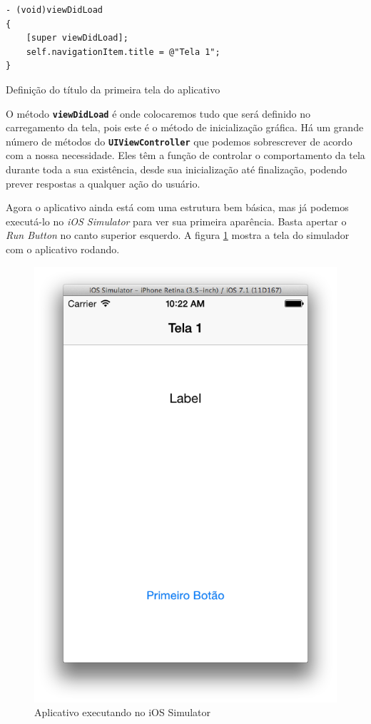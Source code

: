 \documentclass[a4paper,12pt,brazil,oneside]{book}
\begin{document}
\begin{listing}[H]
\begin{verbatim}
- (void)viewDidLoad
{
    [super viewDidLoad];
    self.navigationItem.title = @"Tela 1";
}
\end{verbatim}
\caption{Definição do título da primeira tela do aplicativo}
\end{listing}


O método \texttt{\textbf{viewDidLoad}} é onde colocaremos tudo que será definido no carregamento da tela, pois este é o método de inicialização gráfica. Há um grande número de métodos do \texttt{\textbf{UIViewController}} que podemos sobrescrever de acordo com a nossa necessidade. Eles têm a função de controlar o comportamento da tela durante toda a sua existência, desde sua inicialização até finalização, podendo prever respostas a qualquer ação do usuário.

Agora o aplicativo ainda está com uma estrutura bem básica, mas já podemos executá-lo no \emph{iOS Simulator} para ver sua primeira aparência. Basta apertar o \emph{Run Button} no canto superior esquerdo. A figura \ref{fig:app_executanto1} mostra a tela do simulador com o aplicativo rodando.

\begin{figure}[H]
  \centering
  \includegraphics[width=.55\textwidth]{figuras/3/tela_novo_projeto_26.png}
  \caption{Aplicativo executando no iOS Simulator}
  \label{fig:app_executanto1}
\end{figure}
\end{document}
